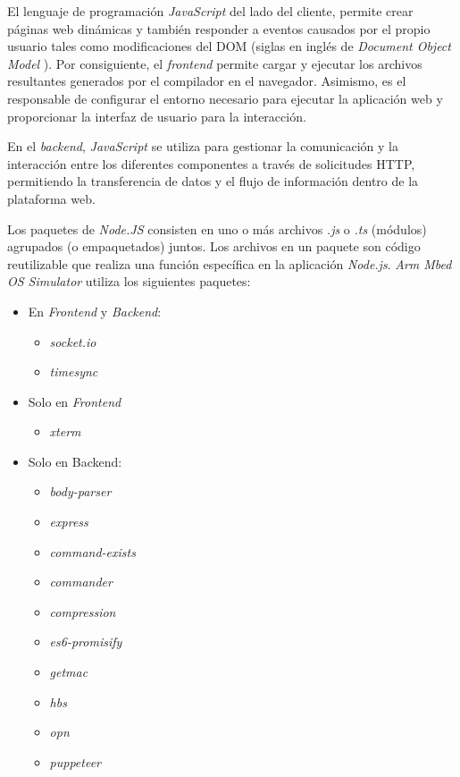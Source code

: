 El lenguaje de programación \textit{JavaScript} del lado del cliente, permite crear páginas web dinámicas y también responder a eventos causados por el propio usuario tales como modificaciones del DOM (siglas en inglés de \textit{Document Object Model} \citep{DOM}). Por consiguiente, el \textit{frontend} permite cargar y ejecutar los archivos resultantes generados por el compilador en el navegador. Asimismo, es el responsable de configurar el entorno necesario para ejecutar la aplicación web y proporcionar la interfaz de usuario para la interacción. 

En el \textit{backend}, \textit{JavaScript} se utiliza para gestionar la comunicación y la interacción entre los diferentes componentes a través de solicitudes HTTP, permitiendo la transferencia de datos y el flujo de información dentro de la plataforma web.

Los paquetes de \textit{Node.JS} consisten en uno o más archivos \textit{.js} o \textit{.ts} (módulos) agrupados (o empaquetados) juntos. Los archivos en un paquete son código reutilizable que realiza una función específica en la aplicación \textit{Node.js}. \textit{Arm Mbed OS Simulator} utiliza los siguientes paquetes:

\begin{itemize}
    \item En \textit{Frontend} y \textit{Backend}:
        \begin{itemize}
    	\item \textit{socket.io}
    	\item \textit{timesync}
        \end{itemize}
    \item Solo en \textit{Frontend}
        \begin{itemize}
            \item \textit{xterm}
        \end{itemize}
    \item Solo en {Backend}:
        \begin{itemize}
            \item \textit{body-parser}
            \item \textit{express}
            \item \textit{command-exists}
            \item \textit{commander}
            \item \textit{compression}
            \item \textit{es6-promisify}
            \item \textit{getmac}
            \item \textit{hbs}
            \item \textit{opn}
            \item \textit{puppeteer}
        \end{itemize}
\end{itemize}

